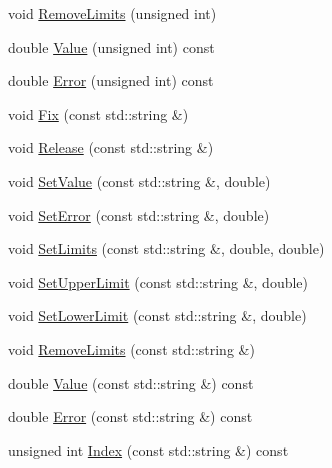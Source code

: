 \begin{DoxyCompactItemize}
\item 
void \mbox{\hyperlink{classROOT_1_1Minuit2_1_1MnUserTransformation_aa7b791dee11011a7442e44c85c06d650}{Remove\+Limits}} (unsigned int)
\item 
double \mbox{\hyperlink{classROOT_1_1Minuit2_1_1MnUserTransformation_a63d57196d60559aa9df6c9c499cd21d0}{Value}} (unsigned int) const
\item 
double \mbox{\hyperlink{classROOT_1_1Minuit2_1_1MnUserTransformation_a9d7f873342a58fe078edd10cc2175faf}{Error}} (unsigned int) const
\item 
void \mbox{\hyperlink{classROOT_1_1Minuit2_1_1MnUserTransformation_ad01d6c104e0c4a26c2ebb34db0ba1752}{Fix}} (const std\+::string \&)
\item 
void \mbox{\hyperlink{classROOT_1_1Minuit2_1_1MnUserTransformation_ac9272ca2d514e879f59b0bb7dcbf9906}{Release}} (const std\+::string \&)
\item 
void \mbox{\hyperlink{classROOT_1_1Minuit2_1_1MnUserTransformation_a30717c0bcc5206cc957e505b9cfd64fd}{Set\+Value}} (const std\+::string \&, double)
\item 
void \mbox{\hyperlink{classROOT_1_1Minuit2_1_1MnUserTransformation_ae63d2c7ee55629e691973082b1099e30}{Set\+Error}} (const std\+::string \&, double)
\item 
void \mbox{\hyperlink{classROOT_1_1Minuit2_1_1MnUserTransformation_ae00c15c6e7def8b4c1c1c9d44b52e647}{Set\+Limits}} (const std\+::string \&, double, double)
\item 
void \mbox{\hyperlink{classROOT_1_1Minuit2_1_1MnUserTransformation_aabe0a301a7d6f7fc322afcc4544e1129}{Set\+Upper\+Limit}} (const std\+::string \&, double)
\item 
void \mbox{\hyperlink{classROOT_1_1Minuit2_1_1MnUserTransformation_aebc0f6d54f3ae5d58b86435529c16796}{Set\+Lower\+Limit}} (const std\+::string \&, double)
\item 
void \mbox{\hyperlink{classROOT_1_1Minuit2_1_1MnUserTransformation_ae5e9a3037483cfc354b739ef44cd1867}{Remove\+Limits}} (const std\+::string \&)
\item 
double \mbox{\hyperlink{classROOT_1_1Minuit2_1_1MnUserTransformation_a89cf5aca1d345e0d2d069ad6a54ff94d}{Value}} (const std\+::string \&) const
\item 
double \mbox{\hyperlink{classROOT_1_1Minuit2_1_1MnUserTransformation_a176d46b9b3b58479a92145e7f9293143}{Error}} (const std\+::string \&) const
\item 
unsigned int \mbox{\hyperlink{classROOT_1_1Minuit2_1_1MnUserTransformation_aa4173a2f341790d8e61635eeed2555bb}{Index}} (const std\+::string \&) const

\end{DoxyCompactItemize}
